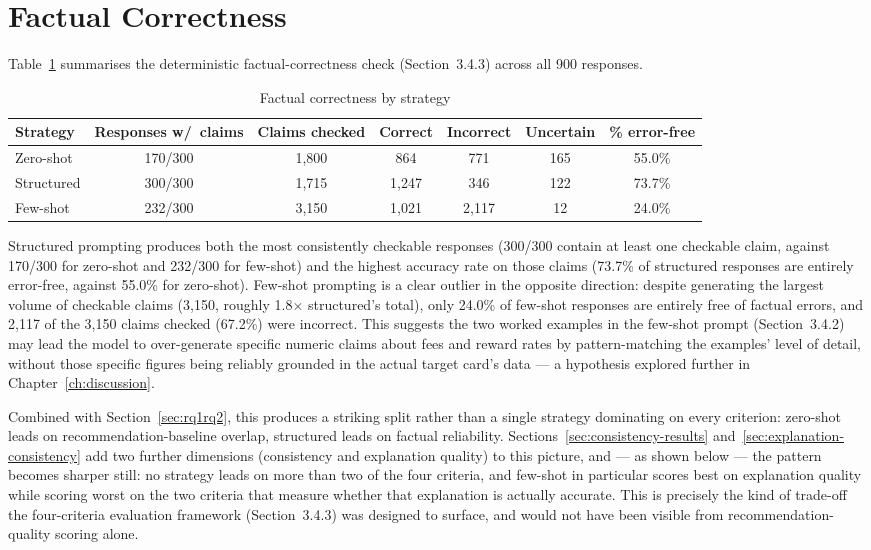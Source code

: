 \section{Factual Correctness}
\label{sec:factual}

Table~\ref{tab:factual} summarises the deterministic factual-correctness check (Section~3.4.3) across all 900 responses.

\begin{table}[htbp]
\centering
\caption{Factual correctness by strategy}
\label{tab:factual}
\begin{tabular}{lcccccc}
\toprule
Strategy & Responses w/\ claims & Claims checked & Correct & Incorrect & Uncertain & \% error-free \\
\midrule
Zero-shot   & 170/300 & 1{,}800 & 864   & 771   & 165 & 55.0\% \\
Structured  & 300/300 & 1{,}715 & 1{,}247 & 346   & 122 & 73.7\% \\
Few-shot    & 232/300 & 3{,}150 & 1{,}021 & 2{,}117 & 12  & 24.0\% \\
\bottomrule
\end{tabular}
\end{table}

Structured prompting produces both the most consistently checkable responses (300/300 contain at least one checkable claim, against 170/300 for zero-shot and 232/300 for few-shot) and the highest accuracy rate on those claims (73.7\% of structured responses are entirely error-free, against 55.0\% for zero-shot). Few-shot prompting is a clear outlier in the opposite direction: despite generating the largest volume of checkable claims (3,150, roughly 1.8$\times$ structured's total), only 24.0\% of few-shot responses are entirely free of factual errors, and 2,117 of the 3,150 claims checked (67.2\%) were incorrect. This suggests the two worked examples in the few-shot prompt (Section~3.4.2) may lead the model to over-generate specific numeric claims about fees and reward rates by pattern-matching the examples' level of detail, without those specific figures being reliably grounded in the actual target card's data --- a hypothesis explored further in Chapter~\ref{ch:discussion}.

Combined with Section~\ref{sec:rq1rq2}, this produces a striking split rather than a single strategy dominating on every criterion: zero-shot leads on recommendation-baseline overlap, structured leads on factual reliability. Sections~\ref{sec:consistency-results} and~\ref{sec:explanation-consistency} add two further dimensions (consistency and explanation quality) to this picture, and --- as shown below --- the pattern becomes sharper still: no strategy leads on more than two of the four criteria, and few-shot in particular scores best on explanation quality while scoring worst on the two criteria that measure whether that explanation is actually accurate. This is precisely the kind of trade-off the four-criteria evaluation framework (Section~3.4.3) was designed to surface, and would not have been visible from recommendation-quality scoring alone.

